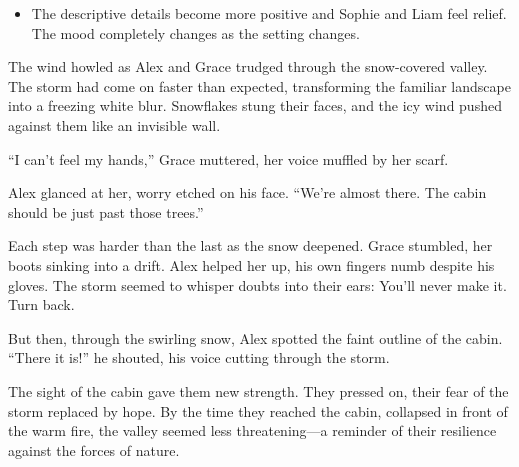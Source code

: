 \documentclass[12pt]{article}
\begin{document}
\begin{tcolorbox}[colframe=black!60, colback=white, 
coltitle=black, colbacktitle=black!15, fonttitle=\bfseries\Large, 
title=Examples, halign title=center, left=10pt, right=10pt, top=10pt, bottom=15pt]
\begin{itemize}
\begin{itemize}
    \begin{itemize}
        \item The descriptive details become more positive and Sophie and Liam feel relief. The mood completely changes as the setting changes.
    \end{itemize}
\end{itemize}
\end{itemize}
 





           









   



 





     \end{tcolorbox}
\vspace{1em}
\begin{tcolorbox}[colframe=black!60, colback=white, 
coltitle=black, colbacktitle=black!15, fonttitle=\bfseries\Large, 
title=Text: Snowstorm in the Valley, halign title=center, left=10pt, right=10pt, top=10pt, bottom=15pt]

The wind howled as Alex and Grace trudged through the snow-covered valley. The storm had come on faster than expected, transforming the familiar landscape into a freezing white blur. Snowflakes stung their faces, and the icy wind pushed against them like an invisible wall.

“I can’t feel my hands,” Grace muttered, her voice muffled by her scarf.

Alex glanced at her, worry etched on his face. “We’re almost there. The cabin should be just past those trees.”

Each step was harder than the last as the snow deepened. Grace stumbled, her boots sinking into a drift. Alex helped her up, his own fingers numb despite his gloves. The storm seemed to whisper doubts into their ears: You’ll never make it. Turn back. 

But then, through the swirling snow, Alex spotted the faint outline of the cabin. “There it is!” he shouted, his voice cutting through the storm. 

The sight of the cabin gave them new strength. They pressed on, their fear of the storm replaced by hope. By the time they reached the cabin, collapsed in front of the warm fire, the valley seemed less threatening—a reminder of their resilience against the forces of nature.

\end{tcolorbox}
\end{document}
